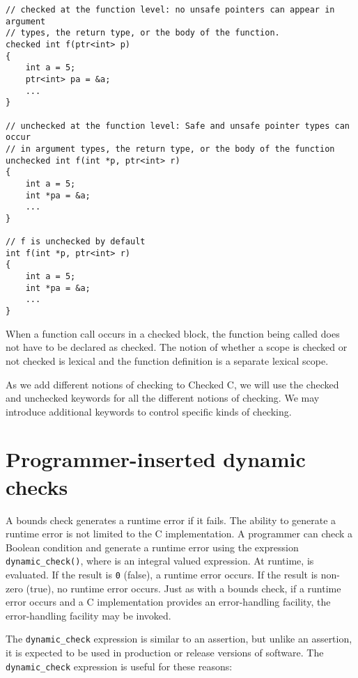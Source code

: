 \begin{verbatim}
// checked at the function level: no unsafe pointers can appear in argument
// types, the return type, or the body of the function.
checked int f(ptr<int> p) 
{
    int a = 5;
    ptr<int> pa = &a;
    ...
}

// unchecked at the function level: Safe and unsafe pointer types can occur 
// in argument types, the return type, or the body of the function
unchecked int f(int *p, ptr<int> r)
{
    int a = 5;
    int *pa = &a;
    ...
}

// f is unchecked by default
int f(int *p, ptr<int> r)
{
    int a = 5;
    int *pa = &a;
    ...
}
\end{verbatim}

When a function call occurs in a checked block, the function being
called does not have to be declared as checked. The notion of whether a
scope is checked or not checked is lexical and the function definition
is a separate lexical scope.

As we add different notions of checking to Checked C, we will use the
checked and unchecked keywords for all the different notions of
checking. We may introduce additional keywords to control specific kinds
of checking.

\section{Programmer-inserted dynamic checks}
\label{section:programmer-dynamic-checks}

A bounds check generates a runtime error if it fails. The ability to
generate a runtime error is not limited to the C implementation. A
programmer can check a Boolean condition and generate a runtime error
using the expression \texttt{dynamic\_check(}\texttt{)}, where
 is an integral valued expression. At runtime,  is
evaluated. If the result is \texttt{0} (false), a runtime error occurs.
If the result is non-zero (true), no runtime error occurs. Just as with
a bounds check, if a runtime error occurs and a C implementation
provides an error-handling facility, the error-handling facility may be
invoked.

The \texttt{dynamic\_check} expression is similar to an assertion, but
unlike an assertion, it is expected to be used in production or release
versions of software. The \texttt{dynamic\_check} expression is useful
for these reasons:

